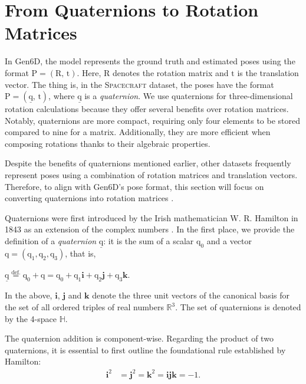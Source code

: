 \section{From Quaternions to Rotation Matrices}

In Gen6D, the model represents the ground truth and estimated poses using the format ${\bm{\mathrm{P}}}=(\bm{\mathrm{R}},\,\bm{\mathrm{t}})$. Here, $\bm{\mathrm{R}}$ denotes the rotation matrix and $\bm{\mathrm{t}}$ is the translation vector.
The thing is, in the \textsc{Spacecraft} dataset, the poses have the format ${\bm{\mathrm{P}}}=(\underline{\bm{\mathrm{q}}},\,\bm{\mathrm{t}})$, where $\underline{\bm{\mathrm{q}}}$ is a \textit{quaternion}. We use quaternions for three-dimensional rotation calculations because they offer several benefits over rotation matrices. Notably, quaternions are more compact, requiring only four elements to be stored compared to nine for a matrix. Additionally, they are more efficient when composing rotations thanks to their algebraic properties.

Despite the benefits of quaternions mentioned earlier, other datasets frequently represent poses using a combination of rotation matrices and translation vectors. Therefore, to align with Gen6D's pose format, this section will focus on converting quaternions into rotation matrices \cite{jia2022quaternions}.

\bigbreak 

Quaternions were first introduced by the Irish mathematician W. R. Hamilton in 1843 as an extension of the complex numbers \cite{Hamilton1866}. In the first place, we provide the definition of a \textit{quaternion} $\underline{\bm{\mathrm{q}}}$: it is the sum of a scalar $\mathrm{q}_0$ and a vector $\bm{\mathrm{q}}=(\mathrm{q}_1, \mathrm{q}_2, \mathrm{q}_3)$, that is,
\begin{center}
	$\underline{\bm{\mathrm{q}}} \stackrel{\text{def.}}{=} \mathrm{q}_0 + \bm{\mathrm{q}} = \mathrm{q}_0 + \mathrm{q}_1\bm{i} + \mathrm{q}_2\bm{j} + \mathrm{q}_3\bm{k}$.
\end{center}

\noindent In the above, $\bm{i}$, $\bm{j}$ and $\bm{k}$ denote the three unit vectors of the canonical basis for 
the set of all ordered triples of real numbers $\mathbb{R}^3$. The set of quaternions is denoted by the 4-space $\mathbb{H}$.

\bigbreak 
The quaternion addition is component-wise. Regarding the product of two quaternions, it is essential to first outline the foundational rule established by \mbox{Hamilton}:
\begin{align*}
	\bm{i}^2 &= \bm{j}^2 = \bm{k}^2 = \bm{ijk}= -1.
\end{align*}

